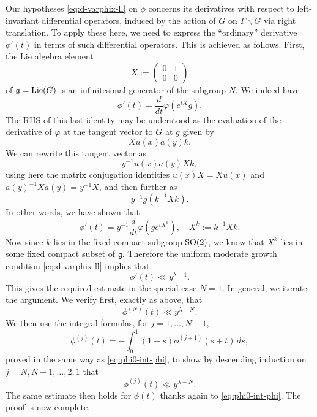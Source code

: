 \documentclass[reqno]{amsart} 
\begin{document}
Our hypotheses \eqref{eq:d-varphix-ll} on $\phi$ concerns its derivatives with respect to left-invariant differential operators, induced by the action of $G$ on $\Gamma \backslash G$ via right translation.  To apply these here, we need to express the ``ordinary'' derivative $\phi '(t)$ in terms of such differential operators.  This is achieved as follows.  First, the Lie algebra element
\begin{equation*}
  X := 
  \begin{pmatrix}
    0 & 1 \\
    0 & 0
  \end{pmatrix}
\end{equation*}
of $\mathfrak{g} = \operatorname{Lie}(G)$ is an infinitesimal generator of the subgroup $N$.  We indeed have
\begin{equation*}
  \phi'(t) = \frac{d}{d t} \varphi(e^{t X} g).
\end{equation*}
The RHS of this last identity may be understood as the evaluation of the derivative of $\varphi$ at the tangent vector to $G$ at $g$ given by
\begin{equation*}
  X u(x) a(y) k.
\end{equation*}
We can rewrite this tangent vector as
\begin{equation*}
  y^{-1} u(x) a(y)  X k,
\end{equation*}
using here the matrix conjugation identities $u(x) X = X u(x)$ and $a(y)^{-1} X a(y) = y^{-1} X$, and then further as
\begin{equation*}
  y^{-1} g ( k^{-1} X k).
\end{equation*}
In other words, we have shown that
\begin{equation*}
  \phi '(t) = y^{-1} \frac{d}{d t} \varphi(g e^{t X^k}),
  \quad
  X^k := k^{-1} X k.
\end{equation*}
Now since $k$ lies in the fixed compact subgroup $\operatorname{SO}(2)$, we know that $X^k$ lies in some fixed compact subset of $\mathfrak{g}$.  Therefore the uniform moderate growth condition \eqref{eq:d-varphix-ll} implies that
\begin{equation*}
  \phi '(t) \ll y^{\lambda -1}.
\end{equation*}
This gives the required estimate in the special case $N = 1$.  In general, we iterate the argument.  We verify first, exactly as above, that
\begin{equation*}
  \phi^{(N)}(t) \ll y^{\lambda - N}.
\end{equation*}
We then use the integral formulas, for $j=1, \dotsc, N-1$,
\begin{equation*}
  \phi^{(j)}(t) = - \int_0^1 (1 - s) \phi^{(j+1)} (s + t) \,d s,
\end{equation*}
proved in the same way as \eqref{eq:phi0-int-phi}, to show by descending induction on $j=N, N-1,\dotsc,2,1$ that
\begin{equation*}
  \phi^{(j)}(t) \ll y^{\lambda - N}.
\end{equation*}
The same estimate then holds for $\phi(t)$ thanks again to \eqref{eq:phi0-int-phi}.  The proof is now complete.
\end{document}
